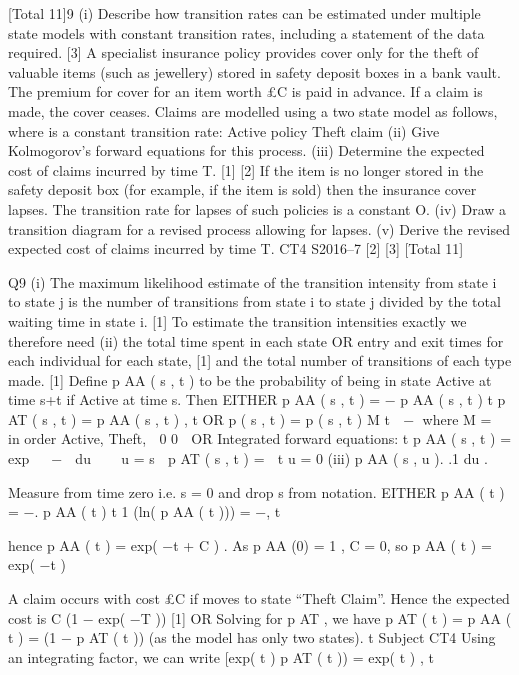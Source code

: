 [Total 11]9
(i)
Describe how transition rates can be estimated under multiple state models
with constant transition rates, including a statement of the data required. [3]
A specialist insurance policy provides cover only for the theft of valuable items (such
as jewellery) stored in safety deposit boxes in a bank vault. The premium for cover
for an item worth £C is paid in advance. If a claim is made, the cover ceases.
Claims are modelled using a two state model as follows, where \mu is a constant
transition rate:
\mu
Active
policy
Theft
claim
(ii) Give Kolmogorov’s forward equations for this process.
(iii) Determine the expected cost of claims incurred by time T.
[1]
[2]
If the item is no longer stored in the safety deposit box (for example, if the item is
sold) then the insurance cover lapses. The transition rate for lapses of such policies is
a constant O.
(iv) Draw a transition diagram for a revised process allowing for lapses.
(v) Derive the revised expected cost of claims incurred by time T.
CT4 S2016–7
[2]
[3]
[Total 11]

Q9
(i)
The maximum likelihood estimate of the transition intensity from state i to state j is
the number of transitions from state i to state j divided by the total waiting time in
state i.
[1]
To estimate the transition intensities exactly we therefore need
(ii)
the total time spent in each state
OR
entry and exit times for each individual for each state, [1]
and the total number of transitions of each type made. [1]
Define p AA ( s , t ) to be the probability of being in state Active at time s+t if Active at
time s.
Then EITHER
\partial
p AA ( s , t ) = − p AA ( s , t ) \mu
\partial t 
\partial
p AT ( s , t ) = p AA ( s , t ) \mu ,
\partial t 
OR
\partial
p ( s , t ) = p ( s , t ) M
\partial t 
 −\mu \mu 
where M = 
 in order Active, Theft,
 0 0  
OR
Integrated forward equations:
t
p AA ( s , t ) = exp   −  \mu du  
 u = s

p AT ( s , t ) = 
t
u = 0
(iii)
p AA ( s , u ). \mu .1 du .


Measure from time zero i.e. s = 0 and drop s from notation.
EITHER
\partial
p AA ( t ) = −\mu .
p AA ( t ) \partial t
1
\partial
(ln( p AA ( t ))) = −\mu ,
\partial t

hence p AA ( t ) = exp( −\mu t + C ) .
As p AA (0) = 1 , C = 0, so
p AA ( t ) = exp( −\mu t )

A claim occurs with cost £C if moves to state “Theft Claim”.
Hence the expected cost is C (1 − exp( −\mu T ))
[1]
OR
Solving for p AT , we have
\partial
p AT ( t ) = p AA ( t ) \mu = (1 − p AT ( t )) \mu (as the model has only two states).
\partial t
Subject CT4 %
Using an integrating factor, we can write
\partial
[exp( \mu t ) p AT ( t )) = \mu exp( \mu t ) ,
\partial t

